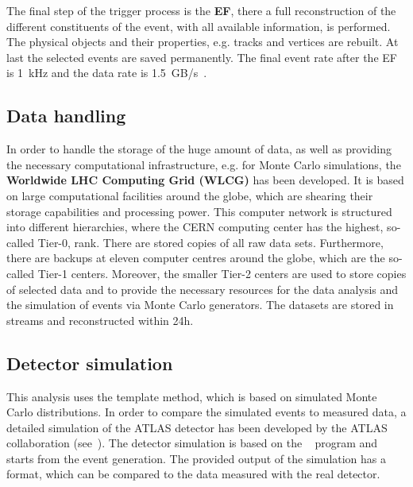 The final step of the trigger process is the \textbf{EF}, there a full reconstruction of the different constituents of the event, with all available information, is performed. The physical objects and their properties, e.g.  tracks and vertices are rebuilt. At last the selected events are saved permanently. The final event rate after the EF is 1~kHz and the data rate is 1.5~GB/s~\cite{Nakahama:2015211}.






\subsection{Data handling}

 In order to handle the storage of the huge amount of data, as well as providing the necessary computational infrastructure, e.g. for Monte Carlo simulations, the\textbf{ Worldwide LHC Computing Grid (WLCG)} has been developed. It is based on large computational facilities around the globe, which are shearing their storage capabilities and processing power. This computer network is structured into different hierarchies, where the CERN computing center has the highest, so-called  Tier-0,  rank. There are stored copies of all raw data sets. Furthermore, there are backups at eleven computer centres around the globe, which are the so-called Tier-1 centers. Moreover,  the smaller Tier-2 centers are used to store copies of selected data and to provide the necessary resources for the data analysis and the simulation of events via Monte Carlo generators. The datasets are stored in streams and reconstructed within 24h.


\subsection{Detector simulation}
This analysis uses the template method, which is based on simulated Monte Carlo distributions. In order to compare the simulated events to measured data, a detailed simulation of the ATLAS detector has been developed by the ATLAS collaboration (see~\cite{Aad:2010ah}). 
The detector simulation is based on the ~\cite{Agostinelli:2002hh} program  and starts from the event generation. The provided output of the simulation has a format, which can be compared to the data measured with the real detector.  

